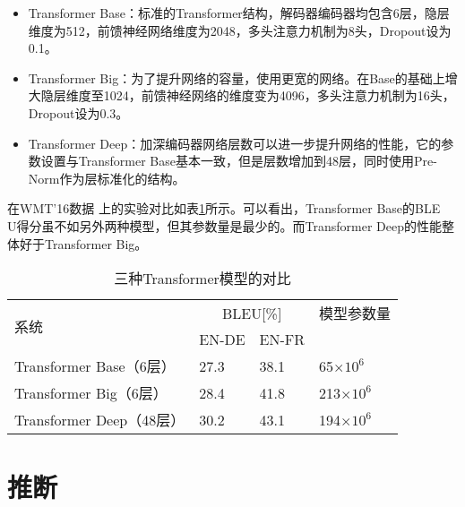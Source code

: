 \begin{itemize}
\vspace{0.5em}
\item  Transformer Base：标准的Transformer结构，解码器编码器均包含6层，隐层维度为512，前馈神经网络维度为2048，多头注意力机制为8头，Dropout设为0.1。
\vspace{0.5em}
\item  Transformer Big：为了提升网络的容量，使用更宽的网络。在Base的基础上增大隐层维度至1024，前馈神经网络的维度变为4096，多头注意力机制为16头，Dropout设为0.3。
\vspace{0.5em}
\item Transformer Deep：加深编码器网络层数可以进一步提升网络的性能，它的参数设置与Transformer Base基本一致，但是层数增加到48层，同时使用Pre-Norm作为层标准化的结构。
\vspace{0.5em}
\end{itemize}

\parinterval 在WMT'16数据 上的实验对比如表\ref{tab:12-3}所示。可以看出，Transformer Base的BLE\\U得分虽不如另外两种模型，但其参数量是最少的。而Transformer Deep的性能整体好于Transformer Big。

\begin{table}[htp]
\centering
\caption{三种Transformer模型的对比}
\label{tab:12-3}
\begin{tabular}{l | l l l}
\multirow{2}{*}{系统}   & \multicolumn{2}{c}{BLEU[\%]} & 模型参数量 \\
                      & EN-DE  & EN-FR  &                                  \\ \hline
Transformer Base（6层）     & 27.3            & 38.1            & 65$\times 10^{6}$                \\
Transformer Big（6层）      & 28.4            & 41.8            & 213$\times 10^{6}$               \\
Transformer Deep（48层） & 30.2            & 43.1            & 194$\times 10^{6}$              \\
\end{tabular}
\end{table}


\section{推断}

